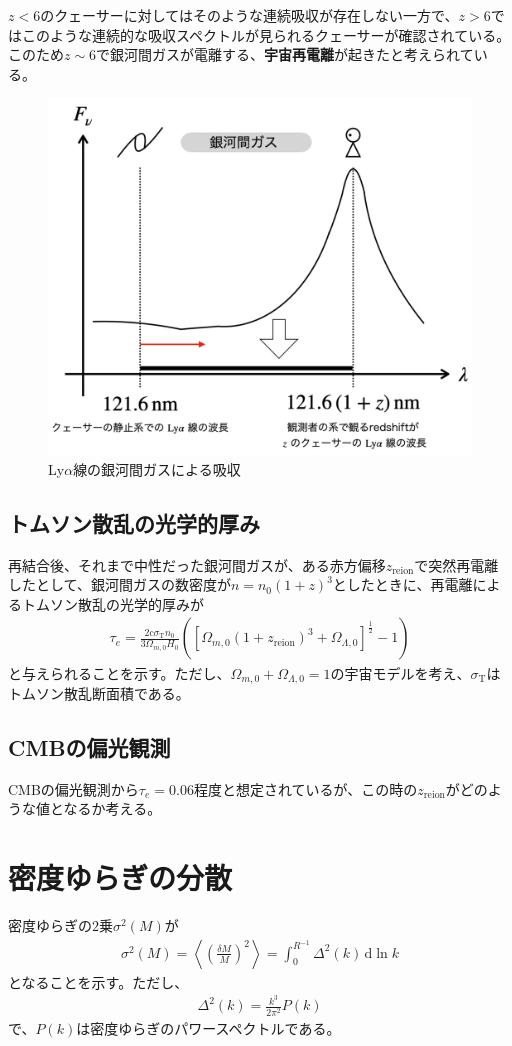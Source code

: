 \documentclass[a4paper,papersize,uplatex,dvipdfmx,10pt]{jsarticle}
\begin{document}
$z<6$のクェーサーに対してはそのような連続吸収が存在しない一方で、$z>6$ではこのような連続的な吸収スペクトルが見られるクェーサーが確認されている。このため$z\sim6$で銀河間ガスが電離する、\textbf{宇宙再電離}が起きたと考えられている。

\begin{figure}
	\centering
	\includegraphics[width=0.6\linewidth]{fig/lyalpha.pdf}
	\caption{Ly$\alpha$線の銀河間ガスによる吸収 \label{fig_lya}}
\end{figure}

\subsection{トムソン散乱の光学的厚み}
再結合後、それまで中性だった銀河間ガスが、ある赤方偏移$z_{\mathrm{reion}}$で突然再電離したとして、銀河間ガスの数密度が$n=n_{0}(1+z)^{3}$としたときに、再電離によるトムソン散乱の光学的厚みが
\begin{align}
  \tau_{e} = \frac{2\mathrm{c}\sigma_{\mathrm{T}}n_{0}}{3\Omega_{m,0}H_{0}}\left( \left[ \Omega_{m,0}(1+z_{\mathrm{reion}})^{3}+\Omega_{\Lambda,0} \right]^{\frac{1}{2}}-1 \right)
\end{align}
と与えられることを示す。ただし、$\Omega_{m,0}+\Omega_{\Lambda,0}=1$の宇宙モデルを考え、$\sigma_{\mathrm{T}}$はトムソン散乱断面積である。

\subsection{CMBの偏光観測}
CMBの偏光観測から$\tau_{e}=0.06$程度と想定されているが、この時の$z_{\mathrm{reion}}$がどのような値となるか考える。

\section{密度ゆらぎの分散}
密度ゆらぎの$2$乗$\sigma^{2}(M)$が
\begin{align}
  \sigma^{2}(M) = \left< \left( \frac{\delta M}{M} \right)^{2} \right> = \int^{R^{-1}}_{0}\Delta^{2}(k)\,\mathrm{d}\ln{k}
\end{align}
となることを示す。ただし、
\begin{align}
  \Delta^{2}(k) = \frac{k^{3}}{2\pi^{2}}P(k)
\end{align}
で、$P(k)$は密度ゆらぎのパワースペクトルである。
\end{document}
